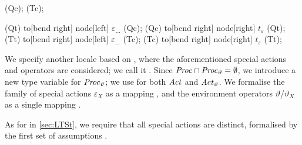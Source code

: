 \begin{isabellebody}
\begin{isamarkuptext}
{{{{    \coordinate [below of=Qt,yshift=10pt] (Qc);
    \coordinate [below of=Tt,yshift=10pt] (Tc);
            
    \draw [dotted,->,shorten >= 7pt] (Qt) to[bend right] node[left] {$\varepsilon_{\dots}$} (Qc);
    \draw [dotted,->,shorten <= 7pt] (Qc) to[bend right] node[right] {$t_\varepsilon$} (Qt);
    \draw [dotted,->,shorten >= 7pt] (Tt) to[bend right] node[left] {$\varepsilon_{\dots}$} (Tc);
    \draw [dotted,->,shorten <= 7pt] (Tc) to[bend right] node[right] {$t_\varepsilon$} (Tt);
}}}}
\vspace{-1cm}%
\end{isamarkuptext}\isamarkuptrue%
%
\isadelimdocument
%
\endisadelimdocument
%
\isatagdocument
%
\isamarkuptrue%
%
\isamarkuptrue%
%
\endisatagdocument
{\isafolddocument}%
%
\isadelimdocument
%
\endisadelimdocument
%
\begin{isamarkuptext}%
We specify another locale based on , where the aforementioned special actions and operators are considered; we call it . 
Since $\mathit{Proc} \cap \mathit{Proc}_\vartheta = \emptyset$, we introduce a new type variable  for $\mathit{Proc}_\vartheta$; we use  for both $\mathit{Act}$ and $\mathit{Act}_\vartheta$.
We formalise the family of special actions $\varepsilon_X$ as a mapping , and the environment operators $\vartheta$/$\vartheta_X$ as a single mapping .

As for  in \cref{sec:LTSt}, we require that all special actions are distinct, formalised by the first set of assumptions .


\end{isamarkuptext}
\end{isabellebody}
